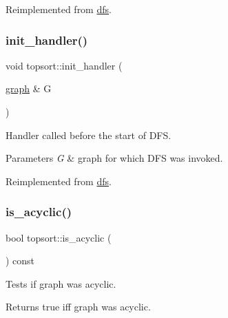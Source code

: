 Reimplemented from \mbox{\hyperlink{classdfs_a1af70060897529e67910f589b047e576}{dfs}}.

\mbox{\label{classtopsort_a21aaf28fc280094ed43288e58d8e3ae1}} 
\subsubsection{\texorpdfstring{init\+\_\+handler()}{init\_handler()}}
{\footnotesize\ttfamily void topsort\+::init\+\_\+handler (\begin{DoxyParamCaption}\item[{\mbox{\hyperlink{classgraph}{graph}} \&}]{G }\end{DoxyParamCaption})\hspace{0.3cm}{\ttfamily [virtual]}}



Handler called before the start of D\+FS. 


\begin{DoxyParams}{Parameters}
{\em G} & graph for which D\+FS was invoked. \\
\hline
\end{DoxyParams}


Reimplemented from \mbox{\hyperlink{classdfs_acc82574cd42ab8256e685374bee5fabb}{dfs}}.

\mbox{\label{classtopsort_a05a4cb00bbd60859f4939355b23c25f1}} 
\subsubsection{\texorpdfstring{is\+\_\+acyclic()}{is\_acyclic()}}
{\footnotesize\ttfamily bool topsort\+::is\+\_\+acyclic (\begin{DoxyParamCaption}{ }\end{DoxyParamCaption}) const\hspace{0.3cm}{\ttfamily [inline]}}

Tests if graph was acyclic.

\begin{DoxyReturn}{Returns}
true iff graph was acyclic. 
\end{DoxyReturn}
\mbox{\label{classtopsort_afd27bb676fd3987456bf71d83c05acb8}} 
